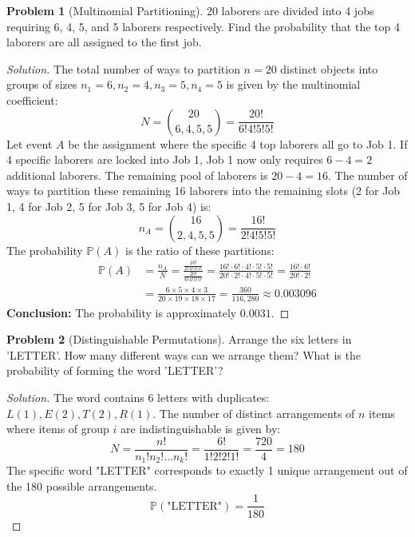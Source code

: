\documentclass[11pt, letterpaper]{article}
\theoremstyle{definition}
\newtheorem{example}{Problem}
\theoremstyle{remark}
\newcommand{\Prob}{\mathbb{P}}
\begin{document}
\begin{example}[Multinomial Partitioning]
    20 laborers are divided into 4 jobs requiring 6, 4, 5, and 5 laborers respectively. Find the probability that the top 4 laborers are all assigned to the first job.
\end{example}
\begin{proof}[Solution]
    The total number of ways to partition $n=20$ distinct objects into groups of sizes $n_1=6, n_2=4, n_3=5, n_4=5$ is given by the multinomial coefficient:
    \[ N = \binom{20}{6, 4, 5, 5} = \frac{20!}{6!4!5!5!} \]
    Let event $A$ be the assignment where the specific 4 top laborers all go to Job 1.
    If 4 specific laborers are locked into Job 1, Job 1 now only requires $6 - 4 = 2$ additional laborers. The remaining pool of laborers is $20 - 4 = 16$.
    The number of ways to partition these remaining 16 laborers into the remaining slots (2 for Job 1, 4 for Job 2, 5 for Job 3, 5 for Job 4) is:
    \[ n_A = \binom{16}{2, 4, 5, 5} = \frac{16!}{2!4!5!5!} \]
    The probability $\Prob(A)$ is the ratio of these partitions:
    \begin{align*}
        \Prob(A) &= \frac{n_A}{N} = \frac{\frac{16!}{2!4!5!5!}}{\frac{20!}{6!4!5!5!}} = \frac{16! \cdot 6! \cdot 4! \cdot 5! \cdot 5!}{20! \cdot 2! \cdot 4! \cdot 5! \cdot 5!} = \frac{16! \cdot 6!}{20! \cdot 2!} \\
        &= \frac{6 \times 5 \times 4 \times 3}{20 \times 19 \times 18 \times 17} = \frac{360}{116,280} \approx 0.003096
    \end{align*}
    \textbf{Conclusion:} The probability is approximately $0.0031$.
\end{proof}

\begin{example}[Distinguishable Permutations]
    Arrange the six letters in 'LETTER'. How many different ways can we arrange them? What is the probability of forming the word 'LETTER'?
\end{example}
\begin{proof}[Solution]
    The word contains 6 letters with duplicates: $L (1), E (2), T (2), R (1)$.
    The number of distinct arrangements of $n$ items where items of group $i$ are indistinguishable is given by:
    \[ N = \frac{n!}{n_1! n_2! \dots n_k!} = \frac{6!}{1! 2! 2! 1!} = \frac{720}{4} = 180 \]
    The specific word "LETTER" corresponds to exactly 1 unique arrangement out of the 180 possible arrangements.
    \[ \Prob(\text{"LETTER"}) = \frac{1}{180} \]
\end{proof}
\end{document}
